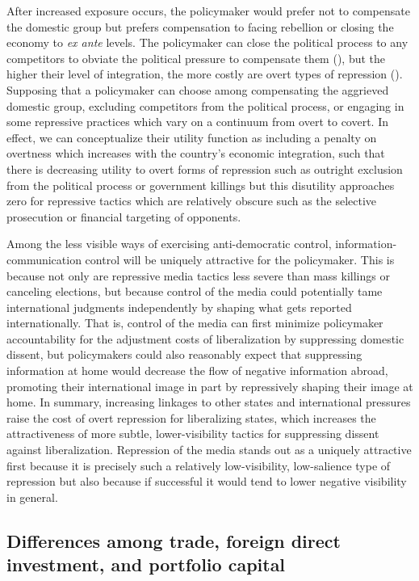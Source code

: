 \documentclass[12pt]{report}
\begin{document}
After increased exposure occurs, the policymaker would prefer not
to compensate the domestic group but prefers compensation to facing
rebellion or closing the economy to \textit{ex ante} levels. The policymaker
can close the political process to any competitors to obviate the
political pressure to compensate them (\citealt{Adsera:2002vt}),
but the higher their level of integration, the more costly are overt
types of repression (\citealt{Levitsky:2002gx}). Supposing that a
policymaker can choose among compensating the aggrieved domestic group,
excluding competitors from the political process, or engaging in some
repressive practices which vary on a continuum from overt to covert.
In effect, we can conceptualize their utility function as including
a penalty on overtness which increases with the country's economic
integration, such that there is decreasing utility to overt forms
of repression such as outright exclusion from the political process
or government killings but this disutility approaches zero for repressive
tactics which are relatively obscure such as the selective prosecution
or financial targeting of opponents.

Among the less visible ways of exercising anti-democratic control,
information-communication control will be uniquely attractive for
the policymaker. This is because not only are repressive media tactics
less severe than mass killings or canceling elections, but because
control of the media could potentially tame international judgments
independently by shaping what gets reported internationally. That
is, control of the media can first minimize policymaker accountability
for the adjustment costs of liberalization by suppressing domestic
dissent, but policymakers could also reasonably expect that suppressing
information at home would decrease the flow of negative information
abroad, promoting their international image in part by repressively
shaping their image at home. In summary, increasing linkages to other
states and international pressures raise the cost of overt repression
for liberalizing states, which increases the attractiveness of more
subtle, lower-visibility tactics for suppressing dissent against liberalization.
Repression of the media stands out as a uniquely attractive first
because it is precisely such a relatively low-visibility, low-salience
type of repression but also because if successful it would tend to
lower negative visibility in general.

\subsection{Differences among trade, foreign direct investment,
and portfolio capital}
\end{document}
